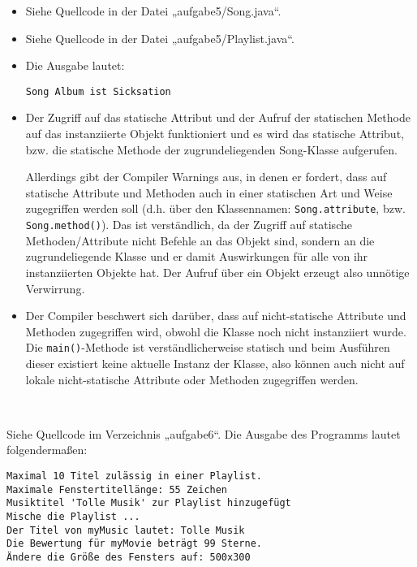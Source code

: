 \documentclass[a4paper]{scrartcl}
\begin{document}
\begin{aufgabe}
	\begin{itemize}
		\item
			Siehe Quellcode in der Datei „aufgabe5/Song.java“.
		\item
			Siehe Quellcode in der Datei „aufgabe5/Playlist.java“.
		\item
			Die Ausgabe lautet:
			\begin{verbatim}
Song Album ist Sicksation
			\end{verbatim}
		\item
			Der Zugriff auf das statische Attribut und der Aufruf der statischen Methode auf das instanziierte Objekt funktioniert und es wird das statische Attribut, bzw. die statische Methode der zugrundeliegenden Song-Klasse aufgerufen.

			Allerdings gibt der Compiler Warnings aus, in denen er fordert, dass auf statische Attribute und Methoden auch in einer statischen Art und Weise zugegriffen werden soll (d.h. über den Klassennamen: \verb|Song.attribute|, bzw. \verb|Song.method()|).
			Das ist verständlich, da der Zugriff auf statische Methoden/Attribute nicht Befehle an das Objekt sind, sondern an die zugrundeliegende Klasse und er damit Auswirkungen für alle von ihr instanziierten Objekte hat.
			Der Aufruf über ein Objekt erzeugt also unnötige Verwirrung.
		\item
			Der Compiler beschwert sich darüber, dass auf nicht-statische Attribute und Methoden zugegriffen wird, obwohl die Klasse noch nicht instanziiert wurde.
			Die \verb|main()|-Methode ist verständlicherweise statisch und beim Ausführen dieser existiert keine aktuelle Instanz der Klasse, also können auch nicht auf lokale nicht-statische Attribute oder Methoden zugegriffen werden.
	\end{itemize}

\end{aufgabe}

\begin{aufgabe}~

	Siehe Quellcode im Verzeichnis „aufgabe6“.
	Die Ausgabe des Programms lautet folgendermaßen:
	\begin{verbatim}
Maximal 10 Titel zulässig in einer Playlist.
Maximale Fenstertitellänge: 55 Zeichen
Musiktitel 'Tolle Musik' zur Playlist hinzugefügt
Mische die Playlist ...
Der Titel von myMusic lautet: Tolle Musik
Die Bewertung für myMovie beträgt 99 Sterne.
Ändere die Größe des Fensters auf: 500x300
	\end{verbatim}
\end{aufgabe}
\end{document}
